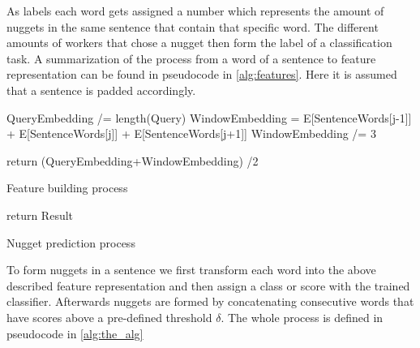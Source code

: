 \documentclass{article}
\begin{document}
As labels each word gets assigned a number which represents the amount of nuggets in the same sentence that contain that specific word. The different amounts of workers that chose a nugget then form the label of a classification task. A summarization of the process from a word of a sentence to feature representation can be found in pseudocode in  \ref{alg:features}. Here it is assumed that a sentence is padded accordingly.

\begin{algorithm}
	\label{alg:features}


	QueryEmbedding /= length(Query)\;
	WindowEmbedding = E[SentenceWords[j-1]] + E[SentenceWords[j]] + E[SentenceWords[j+1]]\;
	WindowEmbedding /= 3\;


	return (QueryEmbedding+WindowEmbedding) /2 \;

	\caption{Feature building process}
\end{algorithm}


\begin{algorithm}
	\label{alg:the_alg}
	return Result \;

	\caption{Nugget prediction process}
\end{algorithm}
To form nuggets in a sentence we first transform each word into the above described feature representation and then assign a class or score with the trained classifier. Afterwards nuggets are formed by concatenating consecutive words that have scores above a pre-defined threshold $\delta$. The whole process is defined in pseudocode in \ref{alg:the_alg}
\end{document}
